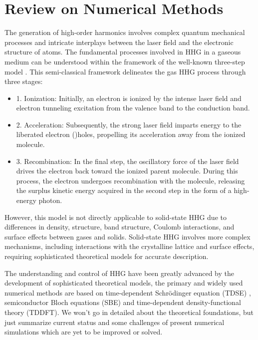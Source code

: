 \section{Review on Numerical Methods}
The generation of high-order harmonics involves complex quantum mechanical processes and intricate
interplays between the laser field and the electronic structure of atoms. The fundamental processes involved in HHG in a gaseous medium can
be understood within the framework of the well-known three-step model  \cite{corkum1993plasma,
lewenstein1994theory}. This semi-classical framework delineates the gas HHG process through three stages:
\begin{itemize}
\item 1. Ionization: Initially, an electron is ionized by the intense laser field and electron tunneling excitation from the valence band to the conduction band.

\item 2. Acceleration: Subsequently, the strong laser field imparts energy to the liberated electron ()holes, propelling its acceleration away from the ionized molecule.

\item 3. Recombination: In the final step, the oscillatory force of the laser field drives the electron back toward the ionized parent molecule. During this process, the electron undergoes recombination with the molecule, releasing the surplus kinetic energy acquired in the second step in the form of a high-energy photon.\\
\end{itemize}

However, this model is not directly applicable to solid-state HHG due to differences in density, structure, band structure, Coulomb interactions, and surface effects between gases and solids. Solid-state HHG involves more complex mechanisms, including interactions with the crystalline lattice and surface effects, requiring sophisticated theoretical models for accurate description.

The understanding and control of HHG have been greatly advanced by the development of sophisticated
theoretical models, the primary and widely used numerical methods are based on time-dependent
Schrödinger equation (\gls{TDSE}) , semiconductor Bloch equations (\gls{SBE})
 and time-dependent density-functional theory (\gls{TDDFT}).
We won't go in detailed about the theoretical foundations, but just summarize current status and some challenges of present numerical simulations which are yet to be improved or solved.

